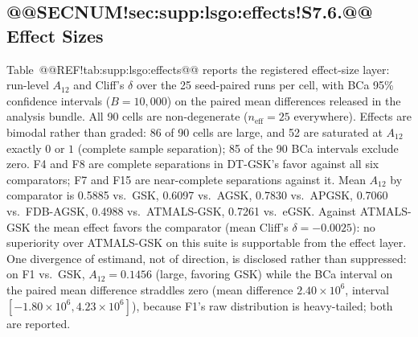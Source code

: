 \documentclass[10pt,a4paper]{article}
\newcommand{\dtgsk}{DT-GSK}
\newcommand{\atmals}{ATMALS-GSK}
\begin{document}
\subsection{@@SECNUM!sec:supp:lsgo:effects!S7.6.@@ Effect Sizes}\label{sec:supp:lsgo:effects}

Table~@@REF!tab:supp:lsgo:effects@@ reports the registered effect-size
layer: run-level $A_{12}$ and Cliff's $\delta$ over the 25 seed-paired
runs per cell, with BCa 95\% confidence intervals ($B = 10{,}000$) on
the paired mean differences released in the analysis bundle.  All 90
cells are non-degenerate ($n_{\mathrm{eff}} = 25$ everywhere).  Effects
are bimodal rather than graded: 86 of 90 cells are large, and 52 are
saturated at $A_{12}$ exactly $0$ or $1$ (complete sample separation);
85 of the 90 BCa intervals exclude zero.  F4 and F8 are complete
separations in \dtgsk{}'s favor against all six comparators; F7 and F15
are near-complete separations against it.  Mean $A_{12}$ by comparator is
0.5885 vs.\ GSK, 0.6097 vs.\ AGSK, 0.7830 vs.\ APGSK, 0.7060 vs.\ FDB-AGSK, 0.4988 vs.\ ATMALS-GSK, 0.7261 vs.\ eGSK.
Against \atmals{} the mean effect favors the comparator (mean Cliff's
$\delta = -0.0025$): no superiority over \atmals{} on this suite is
supportable from the effect layer.  One divergence of estimand, not of
direction, is disclosed rather than suppressed: on F1 vs.\ GSK,
$A_{12} = 0.1456$ (large, favoring GSK) while the BCa interval on the
paired mean difference straddles zero (mean difference $2.40 \times 10^{6}$,
interval $[-1.80 \times 10^{6}, 4.23 \times 10^{6}]$), because F1's raw
distribution is heavy-tailed; both are reported.
\end{document}
